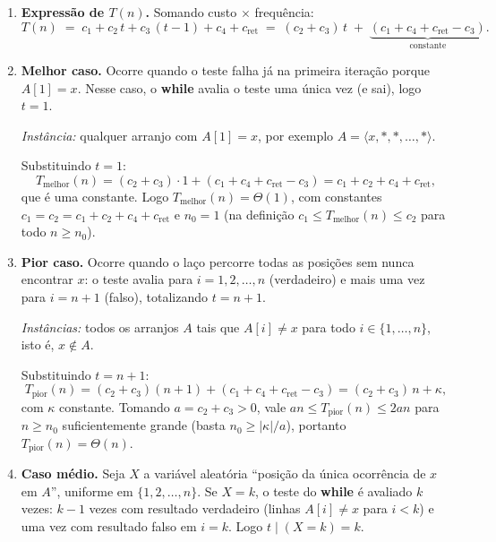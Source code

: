 \documentclass[9pt,a4paper]{extarticle}
\begin{document}
\begin{itemize}
\begin{enumerate}[label=(\alph*)]
    Exatamente uma das linhas~5 ou~7 executa; denotemos por $c_{\text{ret}}$ esse custo terminal (constante, independente de $n$).

    \item \textbf{Expressão de $T(n)$.} Somando custo $\times$ frequência:
    \[
        T(n) \;=\; c_1 + c_2\,t + c_3\,(t-1) + c_4 + c_{\text{ret}}
              \;=\; (c_2 + c_3)\,t \;+\; \underbrace{(c_1 + c_4 + c_{\text{ret}} - c_3)}_{\text{constante}}.
    \]

    \item \textbf{\textcolor{laranja}{Melhor caso.}} Ocorre quando o teste falha já na primeira iteração porque $A[1] = x$. Nesse caso, o \textbf{while} avalia o teste uma única vez (e sai), logo $t = 1$.

    \emph{Instância:} qualquer arranjo com $A[1] = x$, por exemplo $A = \langle x, *, *, \ldots, *\rangle$.

    Substituindo $t = 1$:
    \[
        T_{\text{melhor}}(n) = (c_2 + c_3)\cdot 1 + (c_1 + c_4 + c_{\text{ret}} - c_3) = c_1 + c_2 + c_4 + c_{\text{ret}},
    \]
    que é uma constante. Logo $T_{\text{melhor}}(n) = \Theta(1)$, com constantes $c_1 = c_2 = c_1 + c_2 + c_4 + c_{\text{ret}}$ e $n_0 = 1$ (na definição $c_1 \leq T_{\text{melhor}}(n) \leq c_2$ para todo $n \geq n_0$).

    \item \textbf{\textcolor{laranja}{Pior caso.}} Ocorre quando o laço percorre todas as posições sem nunca encontrar $x$: o teste avalia para $i = 1, 2, \ldots, n$ (verdadeiro) e mais uma vez para $i = n+1$ (falso), totalizando $t = n+1$.

    \emph{Instâncias:} todos os arranjos $A$ tais que $A[i] \neq x$ para todo $i \in \{1, \ldots, n\}$, isto é, $x \notin A$.

    Substituindo $t = n+1$:
    \[
        T_{\text{pior}}(n) = (c_2 + c_3)(n+1) + (c_1 + c_4 + c_{\text{ret}} - c_3) = (c_2 + c_3)\,n + \kappa,
    \]
    com $\kappa$ constante. Tomando $a = c_2 + c_3 > 0$, vale $a n \leq T_{\text{pior}}(n) \leq 2 a n$ para $n \geq n_0$ suficientemente grande (basta $n_0 \geq |\kappa|/a$), portanto $T_{\text{pior}}(n) = \Theta(n)$.

    \item \textbf{\textcolor{laranja}{Caso médio.}} Seja $X$ a variável aleatória ``posição da única ocorrência de $x$ em $A$'', uniforme em $\{1, 2, \ldots, n\}$. Se $X = k$, o teste do \textbf{while} é avaliado $k$ vezes: $k-1$ vezes com resultado verdadeiro (linhas $A[i] \neq x$ para $i < k$) e uma vez com resultado falso em $i = k$. Logo $t \mid (X = k) = k$.


\end{enumerate}
\end{itemize}
\end{document}
